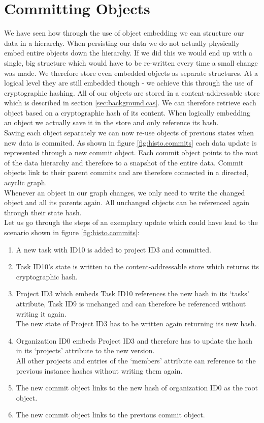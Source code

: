 \section{Committing Objects}
\label{sec:main.committing}
We have seen how through the use of object embedding we can structure our data in a hierarchy.
When persisting our data we do not actually physically embed entire objects down the hierarchy.
If we did this we would end up with a single, big structure which would have to be re-written every time a small change was made.
We therefore store even embedded objects as separate structures.
At a logical level they are still embedded though - we achieve this through the use of cryptographic hashing.
All of our objects are stored in a content-addressable store which is described in section \ref{sec:background.cas}.
We can therefore retrieve each object based on a cryptographic hash of its content.
When logically embedding an object we actually save it in the store and only reference its hash.\\
Saving each object separately we can now re-use objects of previous states when new data is commited.
As shown in figure \ref{fig:histo.commits} each data update is represented through a new commit object.
Each commit object points to the root of the data hierarchy and therefore to a snapshot of the entire data.
Commit objects link to their parent commits and are therefore connected in a directed, acyclic graph.\\
Whenever an object in our graph changes, we only need to write the changed object and all its parents again.
All unchanged objects can be referenced again through their state hash.\\

Let us go through the steps of an exemplary update which could have lead to the scenario shown in figure \ref{fig:histo.commits}:

\begin{enumerate}
\item A new task with ID10 is added to project ID3 and committed.
\item Task ID10's state is written to the content-addressable store which returns its cryptographic hash.
\item Project ID3 which embeds Task ID10 references the new hash in its `tasks' attribute, Task ID9 is unchanged and can therefore be referenced without writing it again.\\
The new state of Project ID3 has to be written again returning its new hash.
\item Organization ID0 embeds Project ID3 and therefore has to update the hash in its `projects' attribute to the new version.\\
All other projects and entries of the `members' attribute can reference to the previous instance hashes without writing them again.
\item The new commit object links to the new hash of organization ID0 as the root object.
\item The new commit object links to the previous commit object.
\end{enumerate}

